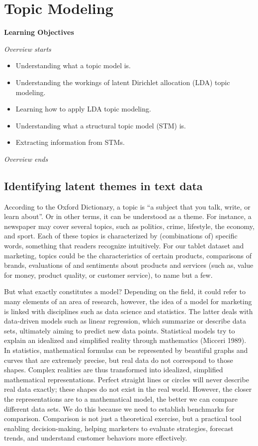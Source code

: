 \chapter{Topic Modeling}\label{sec-topic-modeling}

\textbf{Learning Objectives}

\emph{Overview starts}

\begin{itemize}
\tightlist
\item
  Understanding what a topic model is.
\item
  Understanding the workings of latent Dirichlet allocation
  (LDA) topic modeling.
\item
  Learning how to apply LDA topic modeling.
\item
  Understanding what a structural topic model (STM) is.
\item
  Extracting information from STMs.
\end{itemize}

\emph{Overview ends}

\section{Identifying latent themes in text
data}\label{identifying-latent-themes-in-text-data}

According to the Oxford Dictionary, a topic is ``a subject that you
talk, write, or learn about''. Or in other terms, it can be understood as
a theme. For instance, a newspaper may cover several topics, such as
politics, crime, lifestyle, the economy, and sport. Each of these topics is
characterized by (combinations of) specific words, something that readers
recognize intuitively. For our tablet dataset and marketing, topics could be the characteristics of certain products,
comparisons of brands, evaluations of and sentiments about products and
services (such as, value for money, product quality, or customer
service), to name but a few.

But what exactly constitutes a model? Depending on the field, it could refer to many elements of an area of research, however, the idea of a model for marketing is linked
with disciplines such as data science and statistics. The
latter deals with data-driven models such as linear regression, which
summarize or describe data sets, ultimately aiming to predict new data
points. Statistical models try to explain an idealized and simplified
reality through mathematics (Micceri 1989). In
statistics, mathematical formulas can be represented by beautiful
graphs and curves that are extremely precise, but real data do not correspond to those shapes. Complex realities are thus transformed
into idealized, simplified mathematical representations. Perfect
straight lines or circles will never describe real data exactly; these
shapes do not exist in the real world. However, the closer the representations
are to a mathematical model, the better we can compare different
data sets. We do this because we need to establish benchmarks for comparison.
Comparison is not just a theoretical exercise, but a practical tool enabling
decision-making, helping marketers to evaluate strategies, forecast
trends, and understand customer behaviors more effectively.

